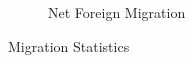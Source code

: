 \begin{figure}[H]
\begin{subfigure}[ht]{0.48\textwidth}
        \caption{Net Foreign Migration}
        \end{subfigure}

      \caption{Migration Statistics}  \label{fig:emigr-immigr}
    \end{figure}